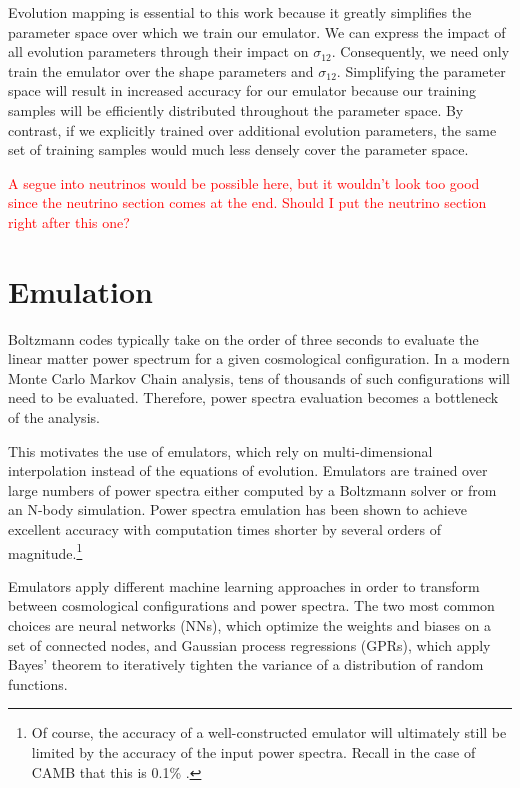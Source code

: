 
Evolution mapping is essential to this work because it greatly simplifies the 
parameter space over which we train our emulator. We can express the impact of
all evolution parameters through their impact on $\sigma_{12}$. Consequently, 
we need only train the emulator over the shape parameters and $\sigma_{12}$.
Simplifying the parameter space will
result in increased accuracy for our emulator because our training samples
will be efficiently distributed throughout the parameter space. By contrast,
if we explicitly trained over additional evolution parameters, the same set of
training samples would much less densely cover the parameter space.

\textcolor{red}{A segue into neutrinos would be possible here, but it
wouldn't look too good since the neutrino section comes at the end. Should I
put the neutrino section right after this one?}



\section{Emulation}
\label{sec: emulation_intro}

Boltzmann codes typically take on the order of three seconds to evaluate the
linear matter power spectrum for a given cosmological configuration. In a
modern Monte Carlo Markov Chain analysis, tens of thousands of such
configurations will need to be evaluated. Therefore, power
spectra evaluation becomes a bottleneck of the analysis.

This motivates the use of emulators, which rely on multi-dimensional 
interpolation instead of the equations of evolution. Emulators are trained 
over large numbers of power spectra either computed
by a Boltzmann solver or from an N-body simulation. Power spectra emulation 
has been shown to achieve excellent accuracy with computation times shorter
by several orders of magnitude.\footnote{Of course, the accuracy of a
well-constructed emulator will ultimately still be limited by the accuracy of 
the input power spectra. Recall in the case of CAMB that this is 0.1\%
.}

Emulators apply different machine
learning approaches in order to transform between cosmological
configurations and power spectra. The two most common choices are neural 
networks (NNs), which optimize the weights and biases on a set of connected 
nodes, and Gaussian process regressions (GPRs), which apply Bayes' theorem to  
iteratively tighten the variance of a distribution of random functions.

